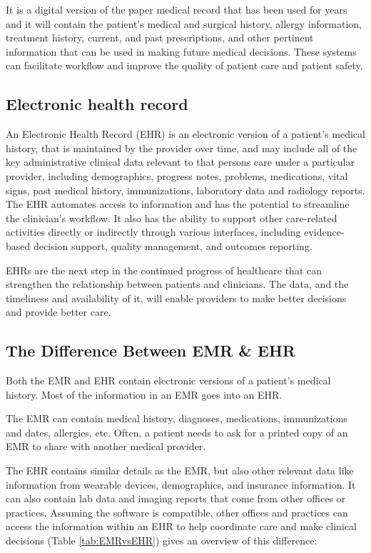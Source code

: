 It  is a digital version of the paper medical record that has been used for years and it will contain the patient’s medical and surgical history, allergy information, treatment history, current, and past prescriptions, and other pertinent information that can be used in making future medical decisions\cite{WheelWhatAre}. These systems can facilitate workflow and improve the quality of patient care and patient safety\cite{ElectronicMedicalRecord}.

\subsection{Electronic health record}
An Electronic Health Record (EHR) is an electronic version of a patient's medical history, that is maintained by the provider over time, and may include all of the key administrative clinical data relevant to that persons care under a particular provider, including demographics, progress notes, problems, medications, vital signs, past medical history, immunizations, laboratory data and radiology reports. The EHR automates access to information and has the potential to streamline the clinician's workflow.  It also has the ability to support other care-related activities directly or indirectly through various interfaces, including evidence-based decision support, quality management, and outcomes reporting. 
 
EHRs are the next step in the continued progress of healthcare that can strengthen the relationship between patients and clinicians.  The data, and the timeliness and availability of it, will enable providers to make better decisions and provide better care\cite{ElectronicHealthRecords}.


\subsection{The Difference Between EMR \& EHR}
Both the EMR and EHR contain electronic versions of a patient's medical history. Most of the information in an EMR goes into an EHR.


The EMR can contain medical history, diagnoses, medications, immunizations and dates, allergies, etc. Often, a patient needs to ask for a printed copy of an EMR to share with another medical provider.


The EHR contains similar details as the EMR, but also other relevant data like information from wearable devices, demographics, and insurance information. It can also contain lab data and imaging reports that come from other offices or practices. Assuming the software is compatible, other offices and practices can access the information within an EHR to help coordinate care and make clinical decisions\cite{KeyMaintainingMedical} (Table \ref{tab:EMRvsEHR}) gives an overview of this difference:




